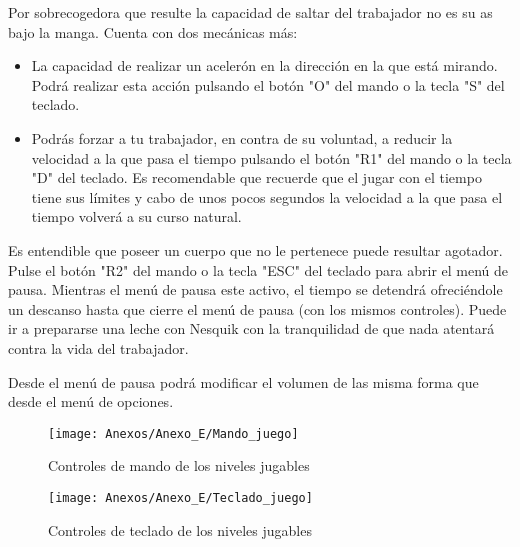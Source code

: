 Por sobrecogedora que resulte la capacidad de saltar del \textcolor{azulWorker}{trabajador} no es su as bajo la manga. Cuenta con dos mecánicas más:
\begin{itemize}
\item
La capacidad de realizar un acelerón en la dirección en la que está mirando. Podrá realizar esta acción pulsando el botón "O" del mando o la tecla "S" del teclado.
\item
Podrás forzar a tu \textcolor{azulWorker}{trabajador}, en contra de su voluntad, a reducir la velocidad a la que pasa el tiempo pulsando el botón "R1" del mando o la tecla "D" del teclado. Es recomendable que recuerde que el jugar con el tiempo tiene sus límites y cabo de unos pocos segundos la velocidad a la que pasa el tiempo volverá a su curso natural.
\end{itemize}


Es entendible que poseer un cuerpo que no le pertenece puede resultar agotador. Pulse el botón "R2" del mando o la tecla "ESC" del teclado para abrir el menú de pausa. Mientras el menú de pausa este activo, el tiempo se detendrá ofreciéndole un descanso hasta que cierre el menú de pausa (con los mismos controles). Puede ir a prepararse una leche con Nesquik con la tranquilidad de que nada atentará contra la vida del \textcolor{azulWorker}{trabajador}.

Desde el menú de pausa podrá modificar el volumen de las misma forma que desde el menú de opciones.

\begin{figure}[h]
\centering
\texttt{[image: Anexos/Anexo\_E/Mando\_juego]}
\caption{Controles de mando de los niveles jugables}
\end{figure}

\begin{figure}[h]
\centering
\texttt{[image: Anexos/Anexo\_E/Teclado\_juego]}
\caption{Controles de teclado de los niveles jugables}
\end{figure}